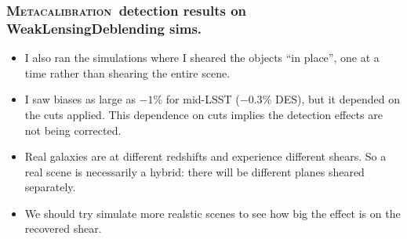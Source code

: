 \documentclass{beamer}
\newcommand{\Mcal}{\textsc{Metacalibration}}
\begin{document}
\begin{frame}
    \frametitle{\Mcal\ detection results on WeakLensingDeblending sims.}

 
    \begin{itemize}

        \item I also ran the simulations where I sheared the objects ``in
            place'', one at a time rather than shearing the entire scene.

        \item I saw biases as large as $-1$\% for mid-LSST ($-0.3$\% DES), but it
            depended on the cuts applied.  This dependence on cuts implies the
            detection effects are not being corrected.

        \item Real galaxies are at different redshifts and experience different
            shears. So a real scene is necessarily a hybrid: there will be
            different planes sheared separately.

        \item We should try simulate more realstic scenes to see how big the
            effect is on the recovered shear.

    \end{itemize}



\end{frame}
\end{document}
